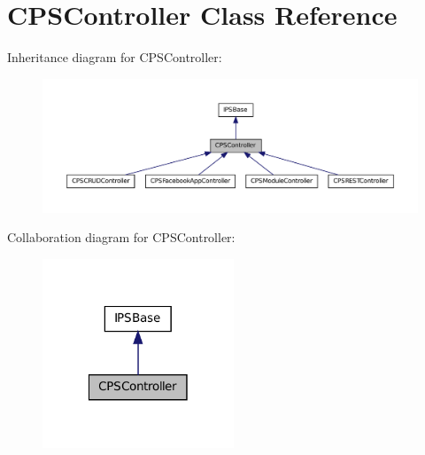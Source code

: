 \hypertarget{classCPSController}{
\section{CPSController Class Reference}
\label{classCPSController}
}


Inheritance diagram for CPSController:\nopagebreak
\begin{figure}[H]
\begin{center}
\leavevmode
\includegraphics[width=400pt]{classCPSController__inherit__graph}
\end{center}
\end{figure}


Collaboration diagram for CPSController:\nopagebreak
\begin{figure}[H]
\begin{center}
\leavevmode
\includegraphics[width=162pt]{classCPSController__coll__graph}
\end{center}
\end{figure}
